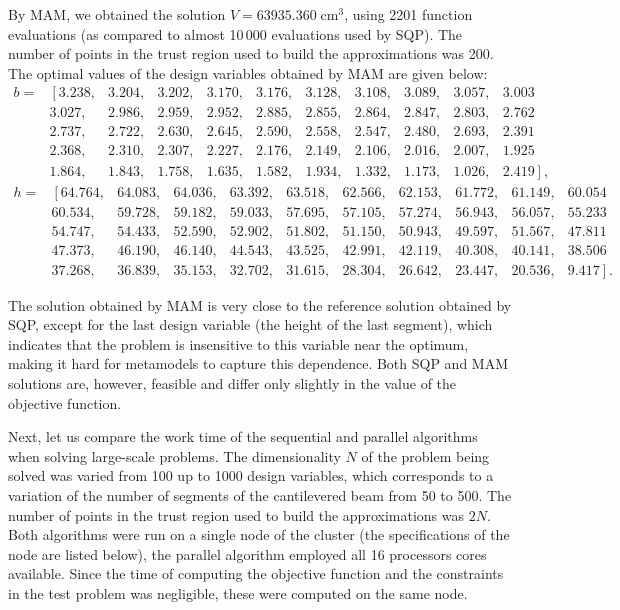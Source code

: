 \documentclass[a4paper]{llncs}
\begin{document}
By MAM, we obtained the solution $V = 63935.360\; \text{cm}^3$, using 2201
function evaluations (as compared to almost 10\,000 evaluations used by SQP).
The number of points in the trust region used to build the approximations was
200. The optimal values of the design variables obtained by MAM are given
below:
\[
\begin{matrix}
	b=&	\left[3.238,\right.&3.204,&3.202,&3.170,&3.176,&3.128,&3.108,&3.089,&3.057,&3.003 \\
		& 3.027,&2.986,&2.959,&2.952,&2.885,&2.855,&2.864,&2.847,&2.803,&2.762 \\
		& 2.737,&2.722,&2.630,&2.645,&2.590,&2.558,&2.547,&2.480,&2.693,&2.391 \\
		& 2.368,&2.310,&2.307,&2.227,&2.176,&2.149,&2.106,&2.016,&2.007,&1.925 \\
		& 1.864,&1.843,&1.758,&1.635,&1.582,&1.934,&1.332,&1.173,&1.026,&\left.2.419\right],
\end{matrix}
\]
\[
\begin{matrix}
	h=& \left[64.764,\right.&64.083,&64.036,&63.392,&63.518,&62.566,&62.153,&61.772,&61.149,& 60.054  \\
		& 60.534,&59.728,&59.182,&59.033,&57.695,&57.105,&57.274,&56.943,&56.057,&55.233  \\
		& 54.747,&54.433,&52.590,&52.902,&51.802,&51.150,&50.943,&49.597,&51.567,&47.811  \\
		& 47.373,&46.190,&46.140,&44.543,&43.525,&42.991,&42.119,&40.308,&40.141,&38.506  \\
		& 37.268,&36.839,&35.153,&32.702,&31.615,&28.304,&26.642,&23.447,&20.536,& \left.9.417\right].
\end{matrix}
\]

The solution obtained by MAM is very close to the reference solution obtained
by SQP, except for the last design variable (the height of the last segment),
which indicates that the problem is insensitive to this variable near the
optimum, making it hard for metamodels to capture this dependence. Both SQP
and MAM solutions are, however, feasible and differ only slightly in the value
of the objective function.

Next, let us compare the work time of the sequential and parallel algorithms
when solving large-scale problems. The dimensionality $N$ of the problem being
solved was varied from 100 up to 1000 design variables, which corresponds to a
variation of the number of segments of the cantilevered beam from 50 to 500.
The number of points in the trust region used to build the approximations was
$2 N$. Both algorithms were run on a single node of the cluster (the
specifications of the node are listed below), the parallel algorithm employed
all 16 processors cores available. Since the time of computing the objective
function and the constraints in the test problem was negligible, these were
computed on the same node.
\end{document}
